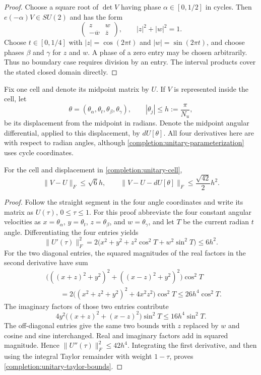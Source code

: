 \begin{proof}
Choose a square root of $\det V$ having phase $\alpha\in[0,1/2]$ in
cycles.  Then $e(-\alpha)V\in SU(2)$ and has the form
\[
 \begin{pmatrix}z&w\\-\overline w&\overline z\end{pmatrix},
 \qquad |z|^2+|w|^2=1.
\]
Choose $t\in[0,1/4]$ with
$|z|=\cos(2\pi t)$ and $|w|=\sin(2\pi t)$, and choose phases $\beta$
and $\gamma$ for $z$ and $w$.  A phase of a zero entry may be chosen
arbitrarily.  Thus no boundary case requires division by an entry.
The interval products cover the stated closed domain directly.
\end{proof}

Fix one cell and denote its midpoint matrix by $U$.  If $V$ is represented
inside the cell, let
\begin{equation}
\label{completion:unitary-cell}
 \theta=(\theta_\alpha,\theta_t,\theta_\beta,\theta_\gamma),\qquad
 |\theta_j|\le h:=\frac{\pi}{N_u},
\end{equation}
be its displacement from the midpoint in radians.  Denote the midpoint
angular differential, applied to this displacement, by $dU[\theta]$.
All four derivatives here are with respect to radian angles, although
\eqref{completion:unitary-parameterization} uses cycle coordinates.

\begin{lemma}
\label{completion:unitary-taylor}
For the cell and displacement in \eqref{completion:unitary-cell},
\begin{equation}
\label{completion:unitary-taylor-bounds}
 \lVert V-U\rVert_F\le\sqrt6 h,\qquad
 \lVert V-U-dU[\theta]\rVert_F\le\frac{\sqrt{42}}2h^2.
\end{equation}
\end{lemma}

\begin{proof}
Follow the straight segment in the four angle coordinates and write its
matrix as $U(\tau)$, $0\le\tau\le1$.  For this proof abbreviate the four
constant angular velocities as
$x=\theta_\alpha$, $y=\theta_t$, $z=\theta_\beta$, and
$w=\theta_\gamma$, and let $T$ be the current radian $t$ angle.
Differentiating the four entries yields
\[
 \lVert U'(\tau)\rVert_F^2
 =2\big(x^2+y^2+z^2\cos^2 T+w^2\sin^2 T\big)\le6h^2.
\]
For the two diagonal entries, the squared magnitudes of the real factors
in the second derivative have sum
\begin{align*}
 &\big(((x+z)^2+y^2)^2+((x-z)^2+y^2)^2\big)\cos^2 T\\
 &\qquad=2\big((x^2+z^2+y^2)^2+4x^2z^2\big)\cos^2 T
 \le26h^4\cos^2 T.
\end{align*}
The imaginary factors of those two entries contribute
\[
 4y^2\big((x+z)^2+(x-z)^2\big)\sin^2 T
 \le16h^4\sin^2 T.
\]
The off-diagonal entries give the same two bounds with $z$ replaced by $w$
and cosine and sine interchanged.  Real and imaginary factors add in
squared magnitude.  Hence $\lVert U''(\tau)\rVert_F^2\le42h^4$.
Integrating the first derivative, and then using the integral Taylor
remainder with weight $1-\tau$, proves
\eqref{completion:unitary-taylor-bounds}.
\end{proof}

